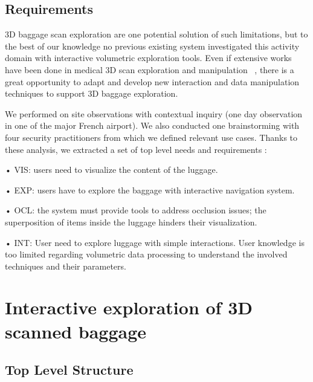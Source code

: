 \subsection{ Requirements }


3D baggage scan exploration are one potential solution of such limitations, but to the best of our knowledge no previous existing system investigated this activity domain with interactive volumetric exploration tools. Even if extensive works have been done in medical 3D scan exploration and manipulation ~\cite{preim2013visual}, there is a great opportunity to adapt and develop new interaction and data manipulation techniques to support 3D baggage exploration.

We performed on site observations with contextual inquiry (one day observation in one of the major French airport). We also conducted one brainstorming with four security practitioners from which we defined relevant use cases. Thanks to these analysis, we extracted a set of top level needs and requirements :

•	VIS: users need to visualize the content of the luggage.

•	EXP: users have to explore the baggage with interactive navigation system.

•	OCL: the system must provide tools to address occlusion issues; the
superposition of items inside the luggage hinders their visualization.

•	INT: User need to explore luggage with simple interactions. User knowledge is too limited regarding volumetric data processing to understand the involved techniques and their parameters.

\section{ Interactive exploration of 3D scanned baggage }

\subsection{Top Level Structure}

